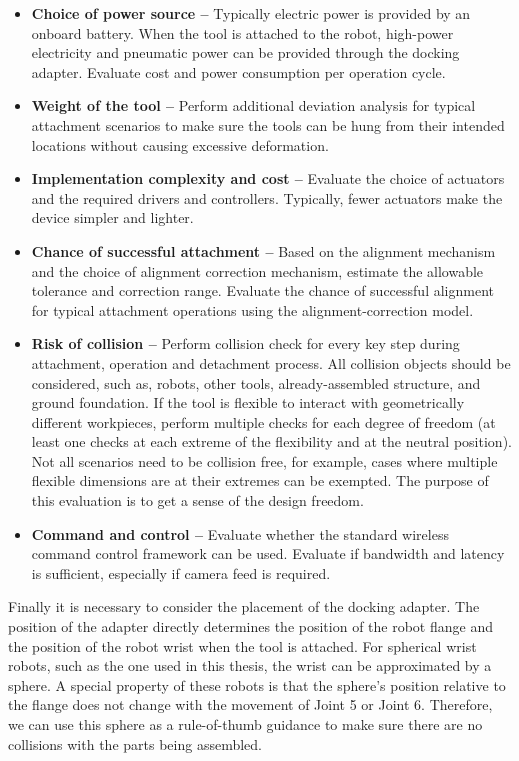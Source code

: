 \begin{itemize}
	\item \textbf{Choice of power source --} Typically electric power is provided by an onboard battery. When the tool is attached to the robot, high-power electricity and pneumatic power can be provided through the docking adapter. Evaluate cost and power consumption per operation cycle.

	\item \textbf{Weight of the tool --} Perform additional deviation analysis for typical attachment scenarios to make sure the tools can be hung from their intended locations without causing excessive deformation.

	\item \textbf{Implementation complexity and cost --} Evaluate the choice of actuators and the required drivers and controllers. Typically, fewer actuators make the device simpler and lighter.

	\item \textbf{Chance of successful attachment --} Based on the alignment mechanism and the choice of alignment correction mechanism, estimate the allowable tolerance and correction range. Evaluate the chance of successful alignment for typical attachment operations using the alignment-correction model. 

	\item \textbf{Risk of collision --} Perform collision check for every key step during attachment, operation and detachment process. All collision objects should be considered, such as, robots, other tools, already-assembled structure, and ground foundation. If the tool is flexible to interact with geometrically different workpieces, perform multiple checks for each degree of freedom (at least one checks at each extreme of the flexibility and at the neutral position). Not all scenarios need to be collision free, for example, cases where multiple flexible dimensions are at their extremes can be exempted. The purpose of this evaluation is to get a sense of the design freedom. 

	\item \textbf{Command and control --} Evaluate whether the standard wireless command control framework can be used. Evaluate if bandwidth and latency is sufficient, especially if camera feed is required.

\end{itemize}
Finally it is necessary to consider the placement of the docking adapter. The position of the adapter directly determines the position of the robot flange and the position of the robot wrist when the tool is attached. For spherical wrist robots, such as the one used in this thesis, the wrist can be approximated by a sphere. A special property of these robots is that the sphere’s position relative to the flange does not change with the movement of Joint 5 or Joint 6. Therefore, we can use this sphere as a rule-of-thumb guidance to make sure there are no collisions with the parts being assembled.

